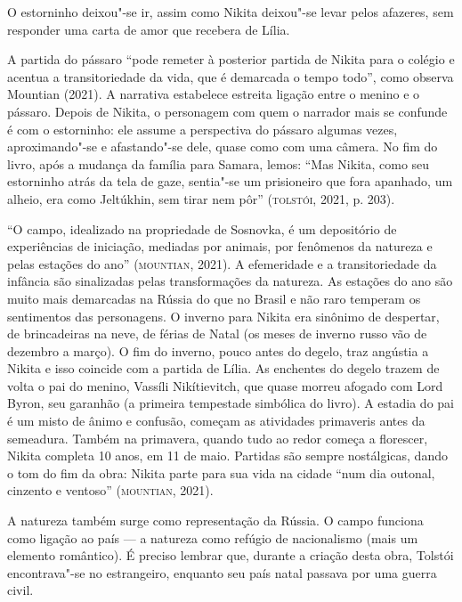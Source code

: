 \documentclass[11pt]{extarticle}
\begin{document}
\begin{enumerate}
O estorninho deixou"-se ir, assim como Nikita deixou"-se
levar pelos afazeres, sem responder uma carta de amor que recebera de
Lília.


A partida do pássaro ``pode remeter à posterior partida de Nikita para o colégio e acentua a transitoriedade da vida, que é demarcada o tempo todo'', como observa
Mountian (2021). A narrativa estabelece estreita ligação
entre o menino e o pássaro. Depois de Nikita, o personagem com quem o
narrador mais se confunde é com o estorninho: ele assume a perspectiva
do pássaro algumas vezes, aproximando"-se e afastando"-se dele,
quase como com uma câmera. No fim do livro, após a mudança da família para
Samara, lemos: ``Mas Nikita, como seu estorninho atrás da tela de gaze,
sentia"-se um prisioneiro que fora apanhado, um alheio, era como
Jeltúkhin, sem tirar nem pôr'' (\textsc{tolstói}, 2021, p. 203).

``O campo, idealizado na propriedade de Sosnovka, é um depositório de
experiências de iniciação, mediadas por animais, por fenômenos da
natureza e pelas estações do ano'' (\textsc{mountian}, 2021). A
efemeridade e a transitoriedade da infância são sinalizadas pelas
transformações da natureza. As estações do ano são muito mais demarcadas
na Rússia do que no Brasil e não raro temperam os sentimentos das
personagens. O inverno para Nikita era sinônimo de despertar, de
brincadeiras na neve, de férias de Natal (os meses de inverno russo vão
de dezembro a março). O fim do inverno, pouco antes do degelo, traz
angústia a Nikita e isso coincide com a partida de Lília. As enchentes
do degelo trazem de volta o pai do menino, Vassíli Nikítievitch, que
quase morreu afogado com Lord Byron, seu garanhão (a primeira tempestade
simbólica do livro). A estadia do pai é um misto de ânimo e confusão,
começam as atividades primaveris antes da semeadura. Também na
primavera, quando tudo ao redor começa a florescer, Nikita completa 10
anos, em 11 de maio. Partidas são sempre nostálgicas, dando o tom do fim
da obra: Nikita parte para sua vida na cidade ``num dia outonal,
cinzento e ventoso'' (\textsc{mountian}, 2021).


A natureza também surge como representação da Rússia. O campo funciona
como ligação ao país --- a natureza como refúgio de nacionalismo (mais
um elemento romântico). É preciso lembrar que, durante a criação desta
obra, Tolstói encontrava"-se no estrangeiro, enquanto seu país natal
passava por uma guerra civil.


\end{enumerate}
\end{document}
